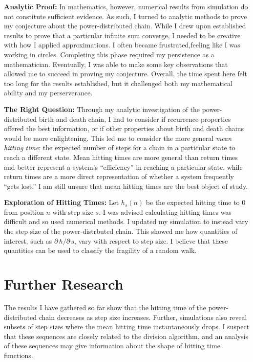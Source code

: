 \documentclass[12pt,letterpaper]{article}
\begin{document}
\noindent
\textbf{Analytic Proof:} In mathematics, however, numerical results from simulation do not constitute
sufficient evidence. As such, I turned to analytic methods to prove my conjecture about the
power-distributed chain. While I drew upon established results to prove that a particular infinite sum
converge, I needed to be creative with how I applied approximations. I often became frustrated,feeling
like I was working in circles. Completing this phase required my persistence as a mathematician.
Eventually, I was able to make some key observations that allowed me to succeed in proving my
conjecture.  Overall, the time spent here felt too long for the results established, but it challenged
both my mathematical ability and my perserverance.

\noindent \textbf{The Right Question:} Through my analytic investigation of the power-distributed birth
and death chain, I had to consider if recurrence properties offered the best information, or if other
properties about birth and death chains would be more enlightening. This led me to consider the more
general \emph{mean hitting time}: the expected number of steps for a chain in a particular state to
reach a different state. Mean hitting times are more general than return times and better represent
a system's ``efficiency'' in reaching a particular state, while return times are a more direct
representation of whether a system frequently ``gets lost.'' I am still unsure that mean hitting times
are the best object of study.

\noindent
\textbf{Exploration of Hitting Times:} Let $h_s(n)$ be the expected hitting time to $0$ from position
$n$ with step size $s$. I was advised calculating hitting times was difficult and so used numerical
methods. I updated my simulation to instead vary the step size of the power-distrbuted chain. This
showed me how quantities of interest, such as $\partial\, h/ \partial\, s$, vary with respect to step
size. I believe that these quantities can be used to classify the fragility of a random walk.


\section*{Further Research}
The results I have gathered so far show that the hitting time of the power-distributed chain decreases
as step size increases. Further, simulations also reveal subsets of step sizes where the mean hitting
time instantaneously drops. I suspect that these sequences are closely related to the division
algorithm, and an analysis of these sequences may give information about the shape of hitting time
functions.
\end{document}
